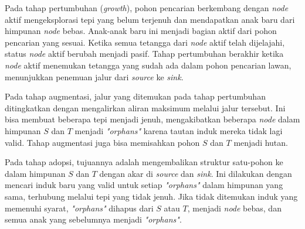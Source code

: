Pada tahap pertumbuhan (\emph{growth}), pohon pencarian berkembang dengan \emph{node} 
aktif mengeksplorasi tepi yang belum terjenuh dan mendapatkan anak baru dari himpunan 
\emph{node} bebas. Anak-anak baru ini menjadi bagian aktif dari pohon pencarian yang 
sesuai. Ketika semua tetangga dari \emph{node} aktif telah dijelajahi, status \emph{node} aktif 
berubah menjadi pasif. Tahap pertumbuhan berakhir ketika \emph{node} aktif menemukan 
tetangga yang sudah ada dalam pohon pencarian lawan, menunjukkan penemuan jalur dari 
\emph{source} ke \emph{sink}.


Pada tahap augmentasi, jalur yang ditemukan pada tahap pertumbuhan ditingkatkan 
dengan mengalirkan aliran maksimum melalui jalur tersebut. Ini bisa membuat beberapa 
tepi menjadi jenuh, mengakibatkan beberapa \emph{node} dalam himpunan \(S\) dan \(T\) menjadi 
\emph{"orphans"} karena tautan induk mereka tidak lagi valid. Tahap augmentasi juga bisa 
memisahkan pohon \(S\) dan \(T\) menjadi hutan.

Pada tahap adopsi, tujuannya adalah mengembalikan struktur satu-pohon ke dalam himpunan 
\(S\) dan \(T\) dengan akar di \emph{source} dan \emph{sink}. Ini dilakukan dengan mencari induk 
baru yang valid untuk setiap \emph{"orphans"} dalam himpunan yang sama, terhubung melalui 
tepi yang tidak jenuh. Jika tidak ditemukan induk yang memenuhi syarat, \emph{"orphans"} 
dihapus dari \(S\) atau \(T\), menjadi \emph{node} bebas, dan semua anak yang sebelumnya 
menjadi \emph{"orphans"}.


